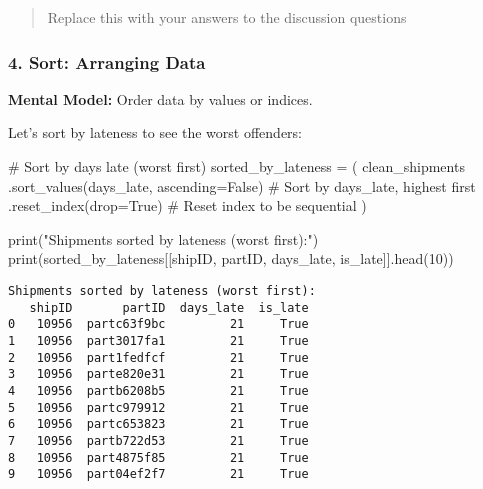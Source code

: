 \documentclass[
  letterpaper,
  DIV=11,
  numbers=noendperiod]{scrartcl}
\newenvironment{Shaded}{\begin{snugshade}}{\end{snugshade}}
\newcommand{\BuiltInTok}[1]{\textcolor[rgb]{0.00,0.23,0.31}{#1}}
\newcommand{\CommentTok}[1]{\textcolor[rgb]{0.37,0.37,0.37}{#1}}
\newcommand{\DecValTok}[1]{\textcolor[rgb]{0.68,0.00,0.00}{#1}}
\newcommand{\NormalTok}[1]{\textcolor[rgb]{0.00,0.23,0.31}{#1}}
\newcommand{\OperatorTok}[1]{\textcolor[rgb]{0.37,0.37,0.37}{#1}}
\newcommand{\StringTok}[1]{\textcolor[rgb]{0.13,0.47,0.30}{#1}}
\newcommand{\VariableTok}[1]{\textcolor[rgb]{0.07,0.07,0.07}{#1}}
\begin{document}
\begin{quote}
Replace this with your answers to the discussion questions
\end{quote}

\subsubsection{4. Sort: Arranging Data}\label{sort-arranging-data}

\textbf{Mental Model:} Order data by values or indices.

Let's sort by lateness to see the worst offenders:

\label{mental-model-4-sort}
\begin{Shaded}
\begin{Highlighting}[]
\CommentTok{\# Sort by days late (worst first)}
\NormalTok{sorted\_by\_lateness }\OperatorTok{=}\NormalTok{ (}
\NormalTok{    clean\_shipments}
\NormalTok{    .sort\_values(}\StringTok{\textquotesingle{}days\_late\textquotesingle{}}\NormalTok{, ascending}\OperatorTok{=}\VariableTok{False}\NormalTok{)  }\CommentTok{\# Sort by days\_late, highest first}
\NormalTok{    .reset\_index(drop}\OperatorTok{=}\VariableTok{True}\NormalTok{)  }\CommentTok{\# Reset index to be sequential}
\NormalTok{)}

\BuiltInTok{print}\NormalTok{(}\StringTok{"Shipments sorted by lateness (worst first):"}\NormalTok{)}
\BuiltInTok{print}\NormalTok{(sorted\_by\_lateness[[}\StringTok{\textquotesingle{}shipID\textquotesingle{}}\NormalTok{, }\StringTok{\textquotesingle{}partID\textquotesingle{}}\NormalTok{, }\StringTok{\textquotesingle{}days\_late\textquotesingle{}}\NormalTok{, }\StringTok{\textquotesingle{}is\_late\textquotesingle{}}\NormalTok{]].head(}\DecValTok{10}\NormalTok{))}
\end{Highlighting}
\end{Shaded}

\begin{verbatim}
Shipments sorted by lateness (worst first):
   shipID       partID  days_late  is_late
0   10956  partc63f9bc         21     True
1   10956  part3017fa1         21     True
2   10956  part1fedfcf         21     True
3   10956  parte820e31         21     True
4   10956  partb6208b5         21     True
5   10956  partc979912         21     True
6   10956  partc653823         21     True
7   10956  partb722d53         21     True
8   10956  part4875f85         21     True
9   10956  part04ef2f7         21     True
\end{verbatim}
\end{document}

